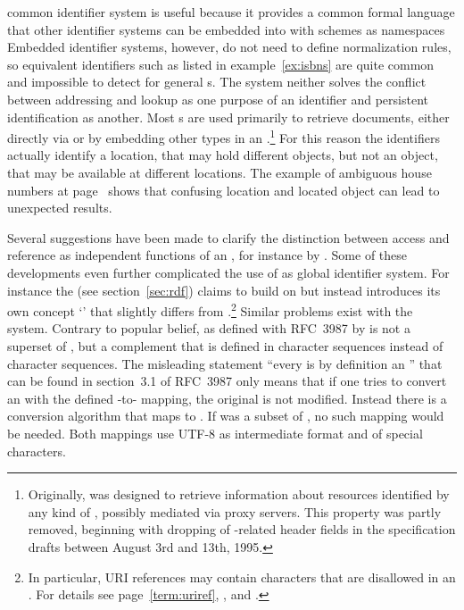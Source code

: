 common identifier system is useful because it provides a common formal 
language that other identifier systems can be embedded into with schemes as
namespaces %
Embedded identifier systems, 
however, do not need to define normalization rules, so equivalent identifiers
such as listed in example~\ref{ex:isbns} are quite common and impossible
to detect for general s. The system neither solves the 
conflict between addressing and lookup as one purpose of an identifier
and persistent identification as another. Most s are used 
primarily to retrieve documents, either directly via  or by 
embedding other  types in an .\footnote{Originally,
 was designed to retrieve information about resources 
identified by any kind of , possibly mediated via proxy 
servers. This property was partly removed, beginning with dropping 
of -related header fields in the  specification 
drafts between August 3rd and 13th, 1995.} 
For this reason the identifiers actually identify a location, that may hold
different objects, but not an object, that may be available at different
locations. The example of ambiguous house numbers at page~\pageref{ex:housenum}
shows that confusing location and located object can lead to unexpected results.

Several suggestions have been made to clarify the distinction between
access and reference as independent functions of an , for
instance by \textcite{Mealling2001}. Some of these developments even further 
complicated the use of  as global identifier system. For instance the 
 (see section~\ref{sec:rdf}) claims to 
build on  but instead introduces its own concept `' 
that slightly differs from .\footnote{In particular, URI references 
may contain characters that are disallowed in an . For details
see page~\ref{term:uriref}, \textcite[section 6.4]{Klyne2004},
and \textcite[section 1.2]{Hayes2004}.} Similar problems
exist with the  system.
Contrary to popular belief,  as defined with RFC~3987 by 
\textcite{Duerst2005} is not a superset of , but a complement 
that is defined in  character sequences instead of 
character sequences. The misleading statement ``every  is by 
definition an '' that can be found in section~3.1 of RFC~3987 
only means that if one tries to convert an  with the defined 
-to- mapping, the original  is not 
modified. Instead there is a conversion algorithm that maps  
to . If  was a subset of , no such mapping
would be needed. Both mappings use UTF-8 as intermediate format and 
 of special characters.

